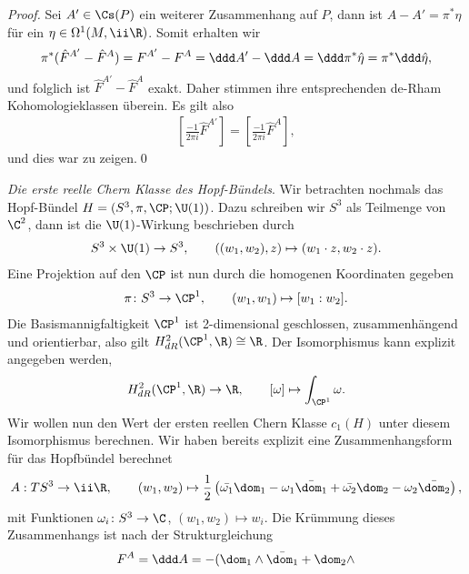 \documentclass[%
	paper=a5,%
	fleqn,%
	DIV=18,%
	BCOR=0mm,
	fontsize=11pt,
	titlepage=false,%
	bibliography=totoc,
	DIV=18,%
	twoside=true,
	pdftitle=Riemannsche Geometrie,
	pdfauthor=Uwe Semmelmann,
	numbers=noendperiod]%
	{scrbook}
\begin{document}
\begin{proof}
Sei $A'\in\Cs(P)$ ein weiterer Zusammenhang auf $P$, dann ist
$A-A'=\pi^*\hat{\eta}$ für ein $\eta\in\Omega^1(M,\ii\R)$. Somit erhalten wir
\begin{align*}
\pi^*(\hat F^{A'}-\hat F^A) = F^{A'}-F^A = \ddd A' - \ddd A = \ddd
\pi^*\hat{\eta} = \pi^*\ddd\hat{\eta},
\end{align*}
und folglich ist $\hat F^{A'}-\hat F^A$ exakt. Daher stimmen ihre entsprechenden de-Rham
Kohomologieklassen überein. Es gilt also
\begin{align*}
\left[\frac{-1}{2\pi i} \hat{F}^{A'}\right] = 
\left[\frac{-1}{2\pi i} \hat{F}^{A}\right],
\end{align*}
und dies war zu zeigen.\qed
\end{proof}

\begin{ex}
\textit{Die erste reelle Chern Klasse des Hopf-Bündels}. Wir betrachten nochmals das Hopf-Bündel $H=(S^3,\pi,\CP;\U(1))$. 
Dazu schreiben wir $S^3$ als Teilmenge von $\C^2$, dann ist die $\U(1)$-Wirkung beschrieben durch
\begin{align*}
S^3\times \U(1)\to S^3,\qquad ((w_1,w_2),z)\mapsto (w_1 \cdot z,w_2\cdot z).
\end{align*}
Eine Projektion auf den $\CP$ ist nun durch die homogenen Koordinaten gegeben
\begin{align*}
\pi\colon S^3\to \CP^1,\qquad (w_1,w_1)\mapsto [w_1:w_2].
\end{align*}
Die Basismannigfaltigkeit $\CP^1$ ist 2-dimensional geschlossen,
zusammenhängend und orientierbar, also gilt $H_{dR}^2(\CP^1,\R)\cong\R$. Der
Isomorphismus kann explizit angegeben werden,
\begin{align*}
H_{dR}^2(\CP^1,\R)\to\R,\qquad [\omega]\mapsto \int_{\CP^1}\omega.
\end{align*}
Wir wollen nun den Wert der ersten reellen Chern Klasse $c_1(H)$ unter diesem
Isomorphismus berechnen. Wir haben bereits explizit eine Zusammenhangsform für
das Hopfbündel berechnet
\begin{align*}
A : TS^3\to \ii\R,\qquad (w_1,w_2) \mapsto 
\frac{1}{2}\left(\bar{\omega_1}\dom_1 - \omega_1\bar{\dom_1} +
\bar{\omega_2}\dom_2 - \omega_2\bar{\dom_2} \right),
\end{align*}
mit Funktionen $\omega_i \colon S^3\to \C$, $(w_1,w_2)\mapsto w_i$.
Die Krümmung dieses Zusammenhangs ist nach der Strukturgleichung
\begin{align*}
F^A = \ddd A = -(\dom_1\wedge \bar{\dom_1} + \dom_2\wedge

\end{align*}
\end{ex}
\end{document}
